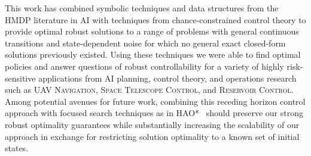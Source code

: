 %

This work has combined symbolic techniques and data structures from
the HMDP literature in AI with techniques from chance-constrained
control theory to provide optimal robust solutions to a range of
problems with general continuous transitions and state-dependent noise
for which no general exact closed-form solutions previously existed.
Using these techniques we were able to find optimal policies and
answer questions of robust controllability for a variety of highly
risk-sensitive applications from AI planning, control theory, and
operations research such as \textsc{UAV Navigation}, \textsc{Space
  Telescope Control}, and \textsc{Reservoir Control}.  Among 
potential avenues for future work, combining this receding horizon
control approach with focused search techniques as in HAO*~\cite{hao09}
should preserve our strong robust optimality guarantees while
substantially increasing the scalability of our approach in exchange
for restricting solution optimality to a known set of initial states.
